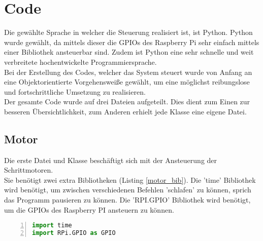 
\chapter{Code}\label{chap:code}
Die gewählte Sprache in welcher die Steuerung realisiert ist, ist Python. Python wurde gewählt, da mittels dieser die \acp{GPIO} des Raspberry Pi sehr einfach mittels einer Bibliothek ansteuerbar sind. Zudem ist Python eine sehr schnelle und weit verbreitete hochentwickelte Programmiersprache.\\
Bei der Erstellung des Codes, welcher das System steuert wurde von Anfang an eine Objektorientierte Vorgehensweiße gewählt, um eine möglichst reibungslose und fortschrittliche Umsetzung zu realisieren.\\
Der gesamte Code wurde auf drei Dateien aufgeteilt. Dies dient zum Einen zur besseren Übersichtlichkeit, zum Anderen erhielt jede Klasse eine eigene Datei.
\section{Motor}
Die erste Datei und Klasse beschäftigt sich mit der Ansteuerung der Schrittmotoren.\\
Sie benötigt zwei extra Bibliotheken (Listing \ref{motor_bib}). Die 'time' Bibliothek wird benötigt, um zwischen verschiedenen Befehlen 'schlafen' zu können, sprich das Programm pausieren zu können. Die 'RPI.GPIO' Bibliothek wird benötigt, um die \acp{GPIO} des Raspberry PI ansteuern zu können. 
\begin{lstlisting}[caption={Bibliotheken der Motor Klasse}, language={Python}, label={motor_bib}, numbers=left]
import time
import RPi.GPIO as GPIO	
\end{lstlisting}

